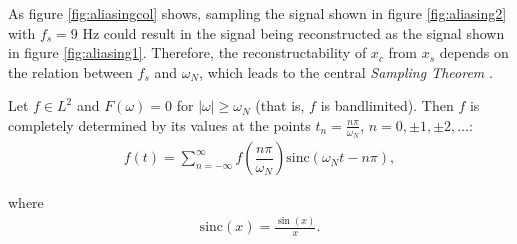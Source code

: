 As figure \ref{fig:aliasingcol} shows, sampling the signal shown in figure \ref{fig:aliasing2} with $f_s = 9$ Hz could result in the signal being reconstructed as the signal shown in figure \ref{fig:aliasing1}. Therefore, the reconstructability of $x_c$ from $x_s$ depends on the relation between $f_s$ and $\omega_N$, which leads to the central \textit{Sampling Theorem} \cite{page 230, FAA}.

\begin{theorem} \label{sampling_theorem}
Let $f \in L^2$ and $F(\omega) = 0$ for $|\omega| \geq \omega_N$ (that is, $f$ is bandlimited). Then $f$ is completely determined by its values at the points $t_n = \frac{n \pi}{\omega_N}$, $n=0,\pm 1,\pm 2,\ldots$:
\begin{align*}
f(t) = \sum_{n=-\infty}^{\infty} f \left( \dfrac{n\pi}{\omega_N} \right) \mathrm{sinc}(\omega_N t - n\pi),
\end{align*}

where
\begin{align}
\mathrm{sinc}(x) = \frac{\sin(x)}{x}.
\end{align}
\end{theorem}

